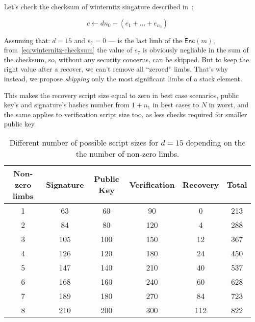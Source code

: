 \documentclass{iacrtrans}
\begin{document}
Let's check the checksum of winternitz singature described
in~\cite{applied-crypto}:

\begin{equation}
  c \gets d n_0 - (e_1 + \ldots + e_{n_0})
\end{equation}\label{eq:winternitz-checksum}

Assuming that: $d=15$ and $e_{7} = 0$ --- is the last limb of the
$\mathsf{Enc}(m)$, from~\eqref{eq:winternitz-checksum} the value of
$e_{7}$ is obviously negliable in the sum of the checksum, so, without
any security concerns, can be skipped. But to keep the right value
after a recover, we can't remove all ``zeroed'' limbs. That's why
instead, we propose \textit{skipping} only the most significant limbs
of a stack element.

This makes the recovery script size equal to zero in best case
scenarios, public key's and signature's hashes number from $1 + n_1$
in best cases to $N$ in worst, and the same applies to verification
script size too, as less checks required for smaller public key.

\iffalse{}
\begin{verbatim}
import math
l = 32
d = 15
w = math.ceil(math.log(d+1, 2))
n0 = math.ceil(l / w)
n1 = math.ceil((2**w * n0).bit_length() / w)

for z in range(1, 8+1):
    k = z + n1
    
    pk_size = 20 * k
    ver_size = 2 * d * k
    sig_size = 21*k
    rec_size = 0
    for i in range(0, z):
        rec_size += int(i * w)
    
    total = pk_size + ver_size + rec_size + sig_size
    
    print(f"{z} & {sig_size} & {pk_size} & {ver_size} & {rec_size} & {total} \\\\")
\end{verbatim}
\fi
\begin{table}[H]
  \centering
  \begin{tabular}{cccccc}
    \toprule
    \textbf{Non-zero limbs} & \textbf{Signature} & \textbf{Public Key} & \textbf{Verification} & \textbf{Recovery} & \textbf{Total} \\
    \midrule
    1 & 63 & 60 & 90 & 0 & 213 \\
    2 & 84 & 80 & 120 & 4 & 288 \\
    3 & 105 & 100 & 150 & 12 & 367 \\
    4 & 126 & 120 & 180 & 24 & 450 \\
    5 & 147 & 140 & 210 & 40 & 537 \\
    6 & 168 & 160 & 240 & 60 & 628 \\
    7 & 189 & 180 & 270 & 84 & 723 \\
    8 & 210 & 200 & 300 & 112 & 822 \\
    \bottomrule
  \end{tabular}
  \caption{Different number of possible script sizes for $d = 15$
    depending on the the number of non-zero
    limbs.}\label{tab:winternitz-script-size}
\end{table}
\end{document}
